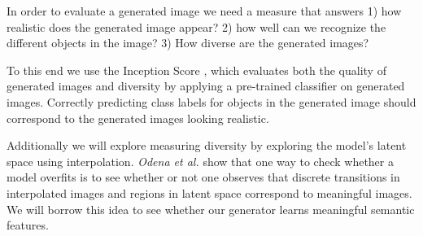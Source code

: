 \documentclass{article}
\begin{document}
In order to evaluate a generated image we need a measure that answers 1) how realistic does the generated image appear? 2) how well can we recognize the different objects in the image? 3) How diverse are the generated images?

To this end we use the Inception Score \cite{inception}, which evaluates both the quality of generated images and diversity by applying a pre-trained classifier on generated images. Correctly predicting class labels for objects in the generated image should correspond to the generated images looking realistic.

Additionally we will explore measuring diversity by exploring the model's latent space using interpolation. \textit{Odena et al.} \cite{auxgan} show that one way to check whether a model overfits is to see whether or not one observes that discrete transitions in interpolated images and regions in latent space correspond to meaningful images. We will borrow this idea to see whether our generator learns meaningful semantic features.
\end{document}
